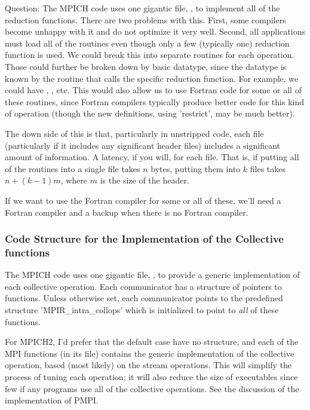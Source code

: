 \documentclass{article}
\begin{document}
Question:
The MPICH code uses one gigantic file, , to implement
all of the reduction functions.  There are two problems with this.
First, some compilers become unhappy with it and do not optimize it
very well.  Second, all applications must load all of the routines
even though only a few (typically one) reduction function is used.  We
could break this into separate routines for each operation.  Those
could further be broken down by basic datatype, since the datatype is
known by the routine that calls the specific reduction function.  
For example, we could have ,
, etc.  This would also allow us to use Fortran
code for some or all of these routines, since Fortran compilers
typically produce better code for this kind of operation (though the
new definitions, using 'restrict', may be much better).

The down side of this is that, particularly in unstripped code, each
file (particularly if it includes any significant header files)
includes a significant amount of information.  A latency, if you will,
for each file.  That is, if putting all of the routines into a single
file takes $n$ bytes, putting them into $k$ files takes $n + (k-1)m$,
where $m$ is the size of the header.  

If we want to use the Fortran compiler for some or all of these, we'll
need a Fortran compiler and a backup when there is no Fortran compiler.

\subsubsection{Code Structure for the Implementation of the Collective
  functions} 

The MPICH code uses one gigantic file, , to provide a
generic implementation of each collective operation.  Each
communicator has a structure of pointers to functions.  Unless
otherwise set, each communicator points to the predefined structure
'MPIR_intra_collops' which is initialized to point to \emph{all} of
these functions.  

For MPICH2, I'd prefer that the default case have no structure, and
each of the MPI functions (in its file) contains the generic
implementation of the collective operation, based (most likely) on the
stream operations.  This will simplify the process of tuning each
operation; it will also reduce the size of executables since few if
any programs use all of the collective operations.
See the discussion of the implementation of PMPI.
\end{document}
